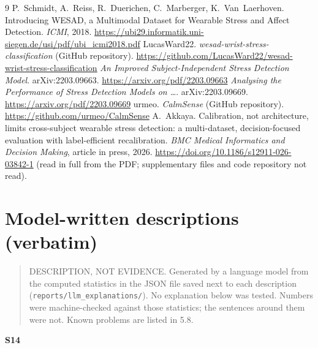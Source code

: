 \documentclass[11pt]{article}
\begin{document}
\begin{thebibliography}{9}
 P.~Schmidt, A.~Reiss, R.~Duerichen, C.~Marberger, K.~Van~Laerhoven. Introducing WESAD, a Multimodal Dataset for Wearable Stress and Affect Detection. \emph{ICMI}, 2018. \url{https://ubi29.informatik.uni-siegen.de/usi/pdf/ubi_icmi2018.pdf}
 LucasWard22. \emph{wesad-wrist-stress-classification} (GitHub repository). \url{https://github.com/LucasWard22/wesad-wrist-stress-classification}
 \emph{An Improved Subject-Independent Stress Detection Model}. arXiv:2203.09663. \url{https://arxiv.org/pdf/2203.09663}
 \emph{Analysing the Performance of Stress Detection Models on \ldots}. arXiv:2203.09669. \url{https://arxiv.org/pdf/2203.09669}
 urmeo. \emph{CalmSense} (GitHub repository). \url{https://github.com/urmeo/CalmSense}
 A.~Akkaya. Calibration, not architecture, limits cross-subject wearable stress detection: a multi-dataset, decision-focused evaluation with label-efficient recalibration. \emph{BMC Medical Informatics and Decision Making}, article in press, 2026. \url{https://doi.org/10.1186/s12911-026-03842-1} (read in full from the PDF; supplementary files and code repository not read).
\end{thebibliography}

\appendix
\section{Model-written descriptions (verbatim)}
\begin{quote}
DESCRIPTION, NOT EVIDENCE. Generated by a language model from the
computed statistics in the JSON file saved next to each description
(\texttt{reports/llm\_explanations/}). No explanation below was tested.
Numbers were machine-checked against those statistics; the sentences
around them were not. Known problems are listed in 5.8.
\end{quote}

\textbf{S14}
\end{document}
